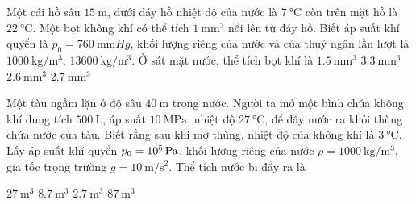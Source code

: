 \begin{ex}
Một cái hồ sâu $\SI{15}{\meter}$, dưới đáy hồ nhiệt độ của nước là $\SI{7}{\celsius}$ còn trên mặt hồ là $\SI{22}{\celsius}$. Một bọt không khí có thể tích $\SI{1}{\milli\meter^3}$ nổi lên từ đáy hồ. Biết áp suất khí quyển là $p_0=\SI{760}{\milli\meter Hg}$, khối lượng riêng của nước và của thuỷ ngân lần lượt là $\SI{1000}{\kilogram/\meter^3}$; $\SI{13600}{\kilogram/\meter^3}$. Ở sát mặt nước, thể tích bọt khí là	
	\choice
	{$\SI{1.5}{\milli\meter^3}$}
	{$\SI{3.3}{\milli\meter^3}$}
	{\True $\SI{2.6}{\milli\meter^3}$}
	{$\SI{2.7}{\milli\meter^3}$}
\end{ex}
\begin{ex}
	Một tàu ngầm lặn ở độ sâu $\SI{40}{\meter}$ trong nước. Người ta mở một bình chứa không khí dung tích $\SI{500}{\liter}$, áp suất $\SI{10}{\mega\pascal}$, nhiệt độ $\SI{27}{\celsius}$, để đẩy nước ra khỏi thùng chứa nước của tàu. Biết rằng sau khi mở thùng, nhiệt độ của không khí là $\SI{3}{\celsius}$. Lấy áp suất khí quyển $p_0=\SI{E5}{\pascal}$, khối lượng riêng của nước $\rho=\SI{1000}{\kilogram/\meter^3}$, gia tốc trọng trường $g=\SI{10}{\meter/\second^2}$. Thể tích nước bị đẩy ra là
	
	\choice
	{$\SI{27}{\meter^3}$}
	{\True $\SI{8.7}{\meter^3}$}
	{$\SI{2.7}{\meter^3}$}
	{$\SI{87}{\meter^3}$}
\end{ex}
